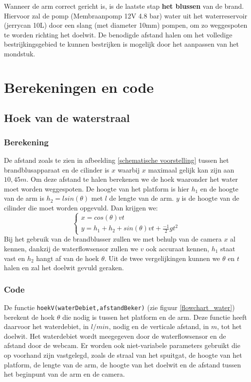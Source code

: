 \documentclass[kulak]{kulakarticle} %
\begin{document}
Wanneer de arm correct gericht is, is de laatste stap \textbf{het blussen} van de brand. Hiervoor zal de pomp (Membraanpomp 12V 4.8 bar) water uit het waterreservoir (jerrycan 10L) door een slang (met diameter 10mm) pompen, om zo weggespoten te worden richting het doelwit. De benodigde afstand halen om het volledige bestrijkingsgebied te kunnen bestrijken is mogelijk door het aanpassen van het mondstuk.


\section{Berekeningen en code}
\subsection{Hoek van de waterstraal}
\subsubsection{Berekening}
De afstand zoals te zien in afbeelding \ref{schematische voorstelling} tussen het brandblusapparaat en de cilinder is \(x\) waarbij \(x\) maximaal gelijk kan zijn aan \(10,45 m\). Om deze afstand te halen berekenen we de hoek waaronder het water moet worden weggespoten. De hoogte van het platform is hier \(h_1\) en de hoogte van de arm is \(h_2 = lsin(\theta)\) met \(l\) de lengte van de arm. \(y\) is de hoogte van de cilinder die moet worden opgevuld. Dan krijgen we:
\begin{equation}
	\begin{cases}
		x  = cos(\theta) v t \\
		y = h_1 + h_2 + sin(\theta) v t + \frac{-1}{2} g t^2
	\end{cases}
\end{equation}
Bij het gebruik van de brandblusser zullen we met behulp van de camera \(x\) al kennen, dankzij de waterflowsensor zullen we \(v\) ook accuraat kennen, \(h_1\) staat vast en \(h_2\) hangt af van de hoek \(\theta\). Uit de twee vergelijkingen kunnen we \(\theta\) en \(t\) halen en zal het doelwit gevuld geraken.

\subsubsection{Code}
De functie \verb*|hoekV(waterDebiet,afstandBeker)| (zie figuur \ref{flowchart_water}) berekent de hoek \(\theta\)  die nodig is tussen het platform en de arm. Deze functie heeft daarvoor het waterdebiet, in \(l/min\), nodig en de verticale afstand, in \(m\), tot het doelwit. Het waterdebiet wordt meegegeven door de waterflowsensor en de afstand door de webcam. Er worden ook niet-variabele parameters gebruikt die op voorhand zijn vastgelegd, zoals de straal van het spuitgat, de hoogte van het platform, de lengte van de arm, de hoogte van het doelwit en de afstand tussen het beginpunt van de arm en de camera. 
\end{document}
